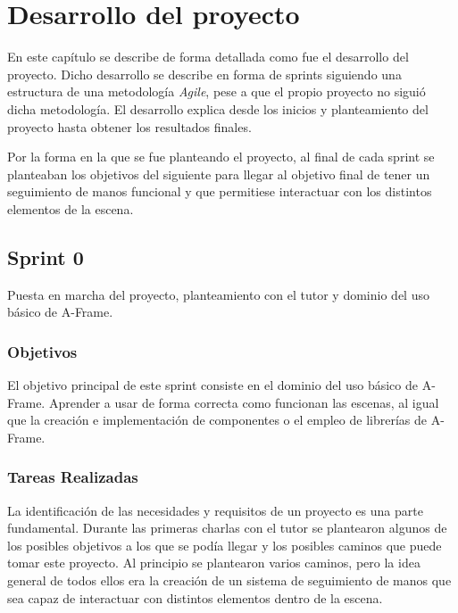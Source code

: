 \documentclass[a4paper, 12pt]{book}
\begin{document}

\cleardoublepage
\chapter{Desarrollo del proyecto}
\label{chap:Desarrollo del proyecto}
En este capítulo se describe de forma detallada como fue el desarrollo del proyecto. Dicho desarrollo
se describe en forma de sprints siguiendo una estructura de una metodología \textit{Agile}\cite{asana_agile_methodology}, pese a que el propio proyecto no siguió dicha metodología. 
El desarrollo explica desde los inicios y planteamiento del proyecto hasta obtener los resultados finales.

Por la forma en la que se fue planteando el proyecto, al final de cada sprint se planteaban los objetivos del siguiente para llegar al objetivo final de tener un seguimiento de manos funcional y que permitiese interactuar con los distintos elementos de la escena. 

\section{Sprint 0}
\label{sec:sprint0}
Puesta en marcha del proyecto, planteamiento con el tutor y dominio del uso básico de A-Frame.

\subsection{Objetivos}
\label{subsec:objetivo-principal0}
El objetivo principal de este sprint consiste en el dominio del uso básico de A-Frame. Aprender a usar de forma correcta como funcionan las escenas, al igual que la creación e implementación de componentes o el empleo de librerías de A-Frame.

\subsection{Tareas Realizadas}
\label{subsec:implementacion0}
La identificación de las necesidades y requisitos de un proyecto es una parte fundamental. Durante las primeras charlas con el tutor se plantearon algunos de los posibles objetivos a los que se podía llegar y los posibles caminos que puede tomar este proyecto. 
Al principio se plantearon varios caminos, pero la idea general de todos ellos era la creación de un sistema de seguimiento de manos que sea capaz de interactuar con distintos elementos dentro de la escena. 
\end{document}
